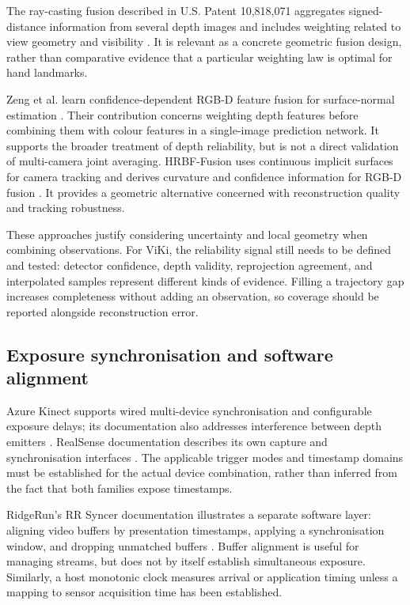 The ray-casting fusion described in U.S. Patent 10,818,071 aggregates
signed-distance information from several depth images and includes weighting
related to view geometry and visibility \cite{fusionpatent}. It is relevant
as a concrete geometric fusion design, rather than comparative evidence that
a particular weighting law is optimal for hand landmarks.

Zeng et al. learn confidence-dependent RGB-D feature fusion for surface-normal
estimation \cite{zeng}. Their contribution concerns weighting depth features
before combining them with colour features in a single-image prediction
network. It supports the broader treatment of depth reliability, but is not
a direct validation of multi-camera joint averaging. HRBF-Fusion uses
continuous implicit surfaces for camera tracking and derives curvature and
confidence information for RGB-D fusion \cite{hrbf}. It provides a geometric
alternative concerned with reconstruction quality and tracking robustness.

These approaches justify considering uncertainty and local geometry when
combining observations. For ViKi, the reliability signal still needs to be
defined and tested: detector confidence, depth validity, reprojection agreement,
and interpolated samples represent different kinds of evidence. Filling a
trajectory gap increases completeness without adding an observation, so
coverage should be reported alongside reconstruction error.

\subsection{Exposure synchronisation and software alignment}

Azure Kinect supports wired multi-device synchronisation and configurable
exposure delays; its documentation also addresses interference between depth
emitters \cite{mskinect}. RealSense documentation describes its own capture
and synchronisation interfaces \cite{intel}. The applicable trigger modes and
timestamp domains must be established for the actual device combination,
rather than inferred from the fact that both families expose timestamps.

RidgeRun's RR Syncer documentation illustrates a separate software layer:
aligning video buffers by presentation timestamps, applying a synchronisation
window, and dropping unmatched buffers \cite{ridgerun}. Buffer alignment is
useful for managing streams, but does not by itself establish simultaneous
exposure. Similarly, a host monotonic clock measures arrival or application
timing unless a mapping to sensor acquisition time has been established.

